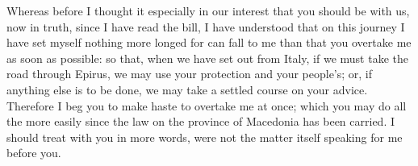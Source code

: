 

Whereas before I thought it especially in our interest that you should be with us, now in truth, since I have read the bill, I have understood that on this journey I have set myself nothing more longed for can fall to me than that you overtake me as soon as possible: so that, when we have set out from Italy, if we must take the road through Epirus, we may use your protection and your people's; or, if anything else is to be done, we may take a settled course on your advice. Therefore I beg you to make haste to overtake me at once; which you may do all the more easily since the law on the province of Macedonia has been carried. I should treat with you in more words, were not the matter itself speaking for me before you.
